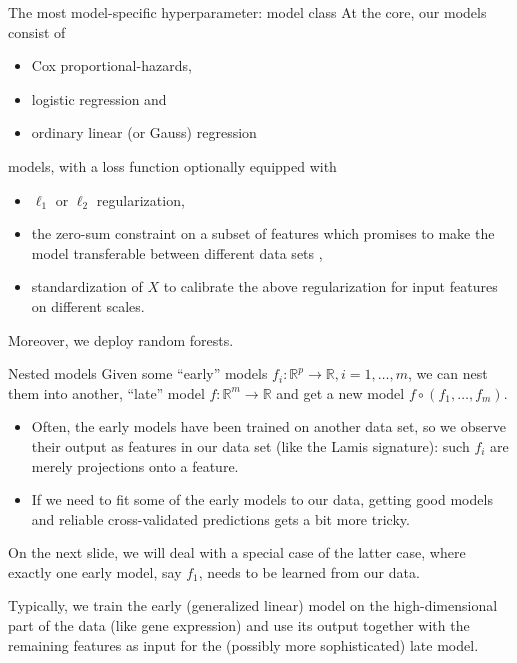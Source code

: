 \documentclass[10pt, aspectratio=169]{beamer}
\def\RR{\mathbb{R}}
\begin{document}
\begin{frame}{The most model-specific hyperparameter: model class}
  At the core, our models consist of 
  \begin{itemize}
    \item Cox proportional-hazards,
    \item logistic regression and 
    \item ordinary linear (or Gauss) regression
  \end{itemize}
  models, \pause with a loss function optionally equipped with
  \begin{itemize}
    \item $\ell_1$ or $\ell_2$ regularization,
    \item the zero-sum constraint on a subset of features which promises to 
      make the model transferable between different data sets 
      \cite{transplatform17},
    \item standardization of $X$ to calibrate the above regularization for input
      features on different scales.
  \end{itemize}

  \pause
  Moreover, we deploy random forests.
\end{frame}

\begin{frame}{Nested models}
  Given some ``early'' models $f_i: \RR^p \to \RR, i = 1, \ldots, m$, we can nest 
  them into another, ``late'' model $f: \RR^m \to \RR$ and get a new model 
  $f \circ (f_1, \ldots, f_m)$.

  \pause
  \begin{itemize}
    \item Often, the early models have been trained on another data set, so we 
      observe their output as features in our data set (like the Lamis 
      signature): such $f_i$ are merely projections onto a feature.
    \item If we need to fit some of the early models to our data, getting good 
      models and reliable cross-validated predictions gets a bit more tricky. 
  \end{itemize}
  \pause
  On the next slide, we will deal with a special case of the latter case, where 
  exactly one early model, say $f_1$, needs to be learned from our data.

  Typically, we train the early (generalized linear) model on the high-dimensional 
  part of the data (like gene expression) and use its output together with the 
  remaining features as input for the (possibly more sophisticated) late model.
\end{frame}
\end{document}

